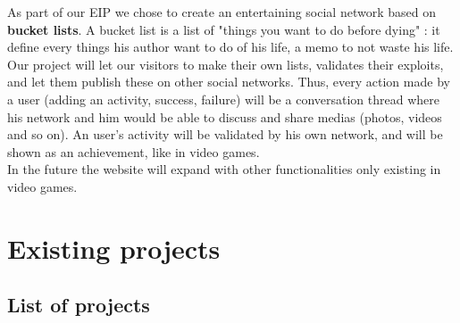 \documentclass{life-en}
\begin{document}
As part of our EIP we chose to create an entertaining social network based on \textbf{bucket lists}. A bucket list is a list of "things you want to do before dying" : it define every things his author want to do of his life, a memo to not waste his life.\\

Our project will let our visitors to make their own lists, validates their exploits, and let them publish these on other social networks. Thus, every action made by a user (adding an activity, success, failure) will be a conversation thread where his network and him would be able to discuss and share medias (photos, videos and so on). An user's activity will be validated by his own network, and will be shown as an achievement, like in video games.\\

In the future the website will expand with other functionalities only existing in video games.

\chapter{Existing projects}

\section{List of projects}
\end{document}
